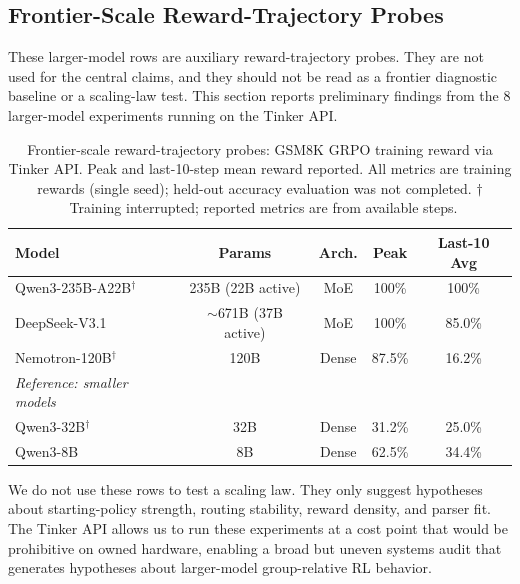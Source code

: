 \subsection{Frontier-Scale Reward-Trajectory Probes}
\label{sec:frontier}

These larger-model rows are auxiliary reward-trajectory probes.  They are not
used for the central claims, and they should not be read as a frontier
diagnostic baseline or a scaling-law test.  This section reports preliminary findings
from the 8 larger-model experiments running on the Tinker API.

\begin{table}[htbp]
\centering
\caption{Frontier-scale reward-trajectory probes: GSM8K GRPO training reward via Tinker API.
Peak and last-10-step mean reward reported. All metrics are training rewards
(single seed); held-out accuracy evaluation was not completed.
$\dagger$~Training interrupted; reported metrics are from available steps.}
\label{tab:frontier}
\begin{tabular}{lcccc}
\toprule
\textbf{Model} & \textbf{Params} & \textbf{Arch.} & \textbf{Peak} & \textbf{Last-10 Avg} \\
\midrule
Qwen3-235B-A22B$^\dagger$ & 235B (22B active) & MoE & 100\% & 100\% \\
DeepSeek-V3.1 & $\sim$671B (37B active) & MoE & 100\% & 85.0\% \\
Nemotron-120B$^\dagger$ & 120B & Dense & 87.5\% & 16.2\% \\
\midrule
\textit{Reference: smaller models} & & & & \\
Qwen3-32B$^\dagger$ & 32B & Dense & 31.2\% & 25.0\% \\
Qwen3-8B & 8B & Dense & 62.5\% & 34.4\% \\
\bottomrule
\end{tabular}
\end{table}

We do not use these rows to test a scaling law.  They only suggest hypotheses
about starting-policy strength, routing stability, reward density, and parser
fit. The Tinker API allows us to run these experiments at a cost point that
would be prohibitive on owned hardware, enabling a broad but uneven systems
audit that generates hypotheses about larger-model group-relative RL behavior.

